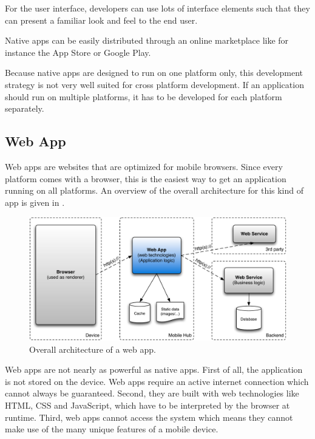 \npar For the user interface, developers can use lots of interface elements such that they can present a familiar look and feel to the end user. 

\npar Native apps can be easily distributed through an online marketplace like for instance the App Store or Google Play. 

\npar Because native apps are designed to run on one platform only, this development strategy is not very well suited for cross platform development. If an application should run on multiple platforms, it has to be developed for each platform separately. 

\subsection{Web App}

\npar Web apps are websites that are optimized for mobile browsers. Since every platform comes with a browser, this is the easiest way to get an application running on all platforms. An overview of the overall architecture for this kind of app is given in .

\begin{figure}
    \begin{center}
        \includegraphics[width=\textwidth]{figs/web.pdf}
        \caption{
            Overall architecture of a web app.
        }
        \label{fig:web}
    \end{center}
\end{figure}

\npar Web apps are not nearly as powerful as native apps. First of all, the application is not stored on the device. Web apps require an active internet connection which cannot always be guaranteed. Second, they are built with web technologies like HTML, CSS and JavaScript, which have to be interpreted by the browser at runtime. Third, web apps cannot access the system which means they cannot make use of the many unique features of a mobile device. 

